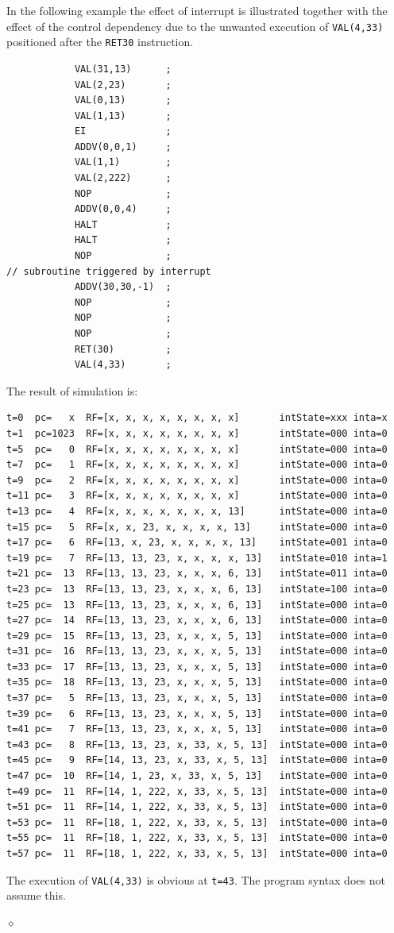 \begin{exemplu}
In the following example the effect of interrupt is illustrated together with  the effect of the control dependency due to the unwanted  execution of {\tt VAL(4,33)} positioned after the {\tt RET{30}} instruction.
\begin{verbatim}
            VAL(31,13)      ;
            VAL(2,23)       ;
            VAL(0,13)       ;
            VAL(1,13)       ;
            EI              ;
            ADDV(0,0,1)     ;
            VAL(1,1)        ;
            VAL(2,222)      ;
            NOP             ;
            ADDV(0,0,4)     ;
            HALT            ;
            HALT            ;
            NOP             ;
// subroutine triggered by interrupt
            ADDV(30,30,-1)  ;
            NOP             ;
            NOP             ;
            NOP             ;
            RET(30)         ;
            VAL(4,33)       ;
\end{verbatim}
The result of simulation is:
{\small
\begin{verbatim}
t=0  pc=   x  RF=[x, x, x, x, x, x, x, x]       intState=xxx inta=x
t=1  pc=1023  RF=[x, x, x, x, x, x, x, x]       intState=000 inta=0
t=5  pc=   0  RF=[x, x, x, x, x, x, x, x]       intState=000 inta=0
t=7  pc=   1  RF=[x, x, x, x, x, x, x, x]       intState=000 inta=0
t=9  pc=   2  RF=[x, x, x, x, x, x, x, x]       intState=000 inta=0
t=11 pc=   3  RF=[x, x, x, x, x, x, x, x]       intState=000 inta=0
t=13 pc=   4  RF=[x, x, x, x, x, x, x, 13]      intState=000 inta=0
t=15 pc=   5  RF=[x, x, 23, x, x, x, x, 13]     intState=000 inta=0
t=17 pc=   6  RF=[13, x, 23, x, x, x, x, 13]    intState=001 inta=0
t=19 pc=   7  RF=[13, 13, 23, x, x, x, x, 13]   intState=010 inta=1
t=21 pc=  13  RF=[13, 13, 23, x, x, x, 6, 13]   intState=011 inta=0
t=23 pc=  13  RF=[13, 13, 23, x, x, x, 6, 13]   intState=100 inta=0
t=25 pc=  13  RF=[13, 13, 23, x, x, x, 6, 13]   intState=000 inta=0
t=27 pc=  14  RF=[13, 13, 23, x, x, x, 6, 13]   intState=000 inta=0
t=29 pc=  15  RF=[13, 13, 23, x, x, x, 5, 13]   intState=000 inta=0
t=31 pc=  16  RF=[13, 13, 23, x, x, x, 5, 13]   intState=000 inta=0
t=33 pc=  17  RF=[13, 13, 23, x, x, x, 5, 13]   intState=000 inta=0
t=35 pc=  18  RF=[13, 13, 23, x, x, x, 5, 13]   intState=000 inta=0
t=37 pc=   5  RF=[13, 13, 23, x, x, x, 5, 13]   intState=000 inta=0
t=39 pc=   6  RF=[13, 13, 23, x, x, x, 5, 13]   intState=000 inta=0
t=41 pc=   7  RF=[13, 13, 23, x, x, x, 5, 13]   intState=000 inta=0
t=43 pc=   8  RF=[13, 13, 23, x, 33, x, 5, 13] 	intState=000 inta=0
t=45 pc=   9  RF=[14, 13, 23, x, 33, x, 5, 13] 	intState=000 inta=0
t=47 pc=  10  RF=[14, 1, 23, x, 33, x, 5, 13]   intState=000 inta=0
t=49 pc=  11  RF=[14, 1, 222, x, 33, x, 5, 13] 	intState=000 inta=0
t=51 pc=  11  RF=[14, 1, 222, x, 33, x, 5, 13] 	intState=000 inta=0
t=53 pc=  11  RF=[18, 1, 222, x, 33, x, 5, 13] 	intState=000 inta=0
t=55 pc=  11  RF=[18, 1, 222, x, 33, x, 5, 13] 	intState=000 inta=0
t=57 pc=  11  RF=[18, 1, 222, x, 33, x, 5, 13] 	intState=000 inta=0
\end{verbatim}
}
The execution of {\tt VAL(4,33)} is obvious at {\tt t=43}. The program syntax does not assume this.

$\diamond$
\end{exemplu}
